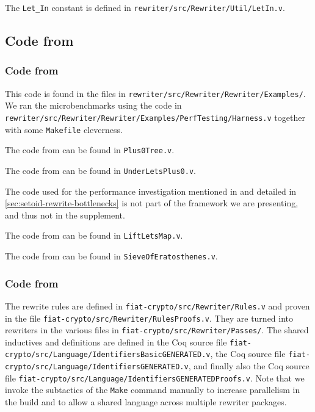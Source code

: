 \begin{subappendices}
The \texttt{Let_In} constant is defined in \texttt{rewriter/src/Rewriter/Util/LetIn.v}.

\subsection{Code from }

\subsubsection{Code from }

This code is found in the files in \texttt{rewriter/src/Rewriter/Rewriter/Examples/}.
We ran the microbenchmarks using the code in \texttt{rewriter/src/Rewriter/Rewriter/Examples/PerfTesting/Harness.v} together with some \texttt{Makefile} cleverness.

The code from  can be found in \texttt{Plus0Tree.v}.

The code from  can be found in \texttt{UnderLetsPlus0.v}.

The code used for the performance investigation mentioned in  and detailed in \autoref{sec:setoid-rewrite-bottlenecks} is not part of the framework we are presenting, and thus not in the supplement.

The code from  can be found in \texttt{LiftLetsMap.v}.

The code from  can be found in \texttt{SieveOfEratosthenes.v}.

\subsubsection{Code from }

The rewrite rules are defined in \texttt{fiat-crypto/src/Rewriter/Rules.v} and proven in the file \texttt{fiat-crypto/src/Rewriter/RulesProofs.v}.
They are turned into rewriters in the various files in \texttt{fiat-crypto/src/Rewriter/Passes/}.
The shared inductives and definitions are defined in the Coq source file \texttt{fiat-crypto/src/Language/IdentifiersBasicGENERATED.v}, the Coq source file \texttt{fiat-crypto/src/Language/IdentifiersGENERATED.v}, and finally also the Coq source file \texttt{fiat-crypto/src/Language/IdentifiersGENERATEDProofs.v}.
Note that we invoke the subtactics of the \texttt{Make} command manually to increase parallelism in the build and to allow a shared language across multiple rewriter packages.

\end{subappendices}
